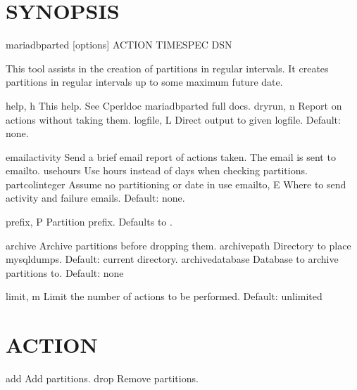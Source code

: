 \documentclass[letterpaper,10pt,english]{sphinxmanual}
\begin{document}
\section{SYNOPSIS}
\label{\detokenize{mariadb-parted-fat:synopsis}}
mariadb\sphinxhyphen{}parted {[}options{]} ACTION TIMESPEC DSN

This tool assists in the creation of partitions in regular intervals.
It creates partitions in regular intervals up to some maximum future date.

\begin{sphinxVerbatim}[commandchars=\\\{\}]
\PYGZhy{}\PYGZhy{}help,          \PYGZhy{}h   This help. See C\PYGZlt{}perldoc mariadb\PYGZhy{}parted\PYGZgt{}  full docs.
\PYGZhy{}\PYGZhy{}dryrun,        \PYGZhy{}n   Report on actions without taking them.
\PYGZhy{}\PYGZhy{}logfile,       \PYGZhy{}L   Direct output to given logfile. Default: none.

\PYGZhy{}\PYGZhy{}email\PYGZhy{}activity      Send a brief email report of actions taken.
                      The email is sent to \PYGZhy{}\PYGZhy{}email\PYGZhy{}to.
\PYGZhy{}\PYGZhy{}use\PYGZhy{}hours          Use hours instead of days when checking partitions.
\PYGZhy{}\PYGZhy{}partcol\PYGZhy{}integer     Assume no partitioning  or date  in use
\PYGZhy{}\PYGZhy{}email\PYGZhy{}to,      \PYGZhy{}E   Where to send activity and failure emails.
                      Default: none.

\PYGZhy{}\PYGZhy{}prefix,        \PYGZhy{}P   Partition prefix. Defaults to .

\PYGZhy{}\PYGZhy{}archive             Archive partitions before dropping them.
\PYGZhy{}\PYGZhy{}archive\PYGZhy{}path        Directory to place mysqldumps.
                      Default: current directory.
\PYGZhy{}\PYGZhy{}archive\PYGZhy{}database    Database to archive partitions to.
                      Default: none

\PYGZhy{}\PYGZhy{}limit,         \PYGZhy{}m   Limit the number of actions to be performed.
                      Default:  unlimited
\end{sphinxVerbatim}


\section{ACTION}
\label{\detokenize{mariadb-parted-fat:action}}
\begin{sphinxVerbatim}[commandchars=\\\{\}]
\PYGZhy{}\PYGZhy{}add   Add partitions.
\PYGZhy{}\PYGZhy{}drop  Remove partitions.
\end{sphinxVerbatim}
\end{document}
